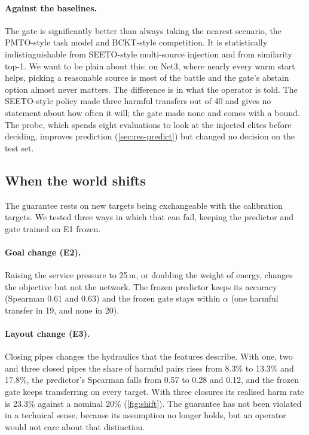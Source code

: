 \documentclass[11pt]{article}
\begin{document}
\paragraph{Against the baselines.} The gate is significantly better than always taking the nearest scenario, the
PMTO-style task model and BCKT-style competition. It is statistically indistinguishable from SEETO-style
multi-source injection and from similarity top-1. We want to be plain about this: on Net3, where nearly every warm
start helps, picking a reasonable source is most of the battle and the gate's abstain option almost never matters.
The difference is in what the operator is told. The SEETO-style policy made three harmful transfers out of 40 and
gives no statement about how often it will; the gate made none and comes with a bound. The probe, which spends eight
evaluations to look at the injected elites before deciding, improves prediction (\cref{sec:res-predict}) but changed
no decision on the test set.

\subsection{When the world shifts}\label{sec:res-shift}

The guarantee rests on new targets being exchangeable with the calibration targets. We tested three ways in which
that can fail, keeping the predictor and gate trained on E1 frozen.

\paragraph{Goal change (E2).} Raising the service pressure to 25\,m, or doubling the weight of energy, changes the
objective but not the network. The frozen predictor keeps its accuracy (Spearman 0.61 and 0.63) and the frozen gate
stays within $\alpha$ (one harmful transfer in 19, and none in 20).

\paragraph{Layout change (E3).} Closing pipes changes the hydraulics that the features describe. With one, two and three
closed pipes the share of harmful pairs rises from 8.3\% to 13.3\% and 17.8\%, the predictor's Spearman falls from 0.57
to 0.28 and 0.12, and the frozen gate keeps transferring on every target. With three closures its realised harm
rate is 23.3\% against a nominal 20\% (\cref{fig:shift}). The guarantee has not been violated in a technical sense,
because its assumption no longer holds, but an operator would not care about that distinction.
\end{document}
